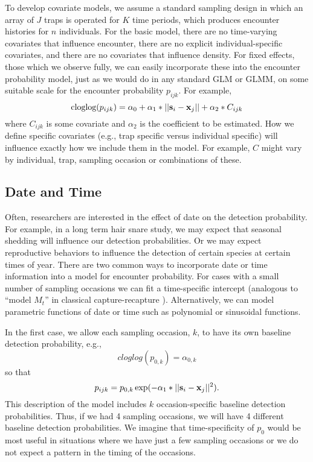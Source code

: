 To develop covariate models, we assume a standard sampling design in which an
array of $J$ traps is operated for $K$ time periods, which produces
encounter histories for $n$ individuals.  For the basic model, there
are no time-varying covariates that influence encounter, there are no
explicit individual-specific covariates, and there are no covariates
that influence density.  For fixed effects, those which we observe
fully, we can easily incorporate these into the encounter probability
model, just as we would do in any standard GLM or GLMM, on some
suitable scale for the encounter probability $p_{ijk}$. For example,
\[
\mbox{cloglog}(p_{ijk}) = \alpha_0 + \alpha_1*||{\bf s}_{i}-{\bf x}_{j}|| +
\alpha_2*C_{ijk}
\]
where $C_{ijk}$ is some covariate and
$\alpha_2$ is the coefficient to be estimated.
 How we define specific covariates (e.g., trap specific
versus individual specific) will influence exactly how we include them
in the model.  For example, $C$ might vary by
individual, trap, sampling occasion or combinations of these.





\subsection{Date and Time}

Often, researchers are interested in the effect of date on the detection
probability. For example, in a long term hair snare study, we may
expect that seasonal shedding will influence our detection
probabilities.  Or we may expect reproductive behaviors to influence
the detection of certain species at certain times of year.  There are
two common ways to incorporate date or time information into a model
for encounter probability. For cases with a small number of sampling
occasions we can fit a time-specific intercept (analogous to ``model
$M_{t}$'' in classical capture-recapture
\citep{otis_etal:1978}). Alternatively, we can model parametric
functions of date or time such as polynomial or sinusoidal functions.

In the first case, 
 we allow each sampling
occasion, $k$, to have its own baseline detection probability, e.g.,
\[
cloglog(p_{0,k}) = \alpha_{0,k}
\]
so that
\[
p_{ijk} = p_{0,k} \exp(- \alpha_1*||{\bf s}_{i}-{\bf x}_{j}||^2).
\]
This
description of the model includes  $k$ occasion-specific baseline detection
probabilities.  Thus, if we had 4 sampling occasions, we will have 4
different baseline detection probabilities.  We imagine that
time-specificity of $p_{0}$ would be most useful 
in situations where we have just a few sampling
occasions or we do not expect a pattern in the timing of the
occasions.

